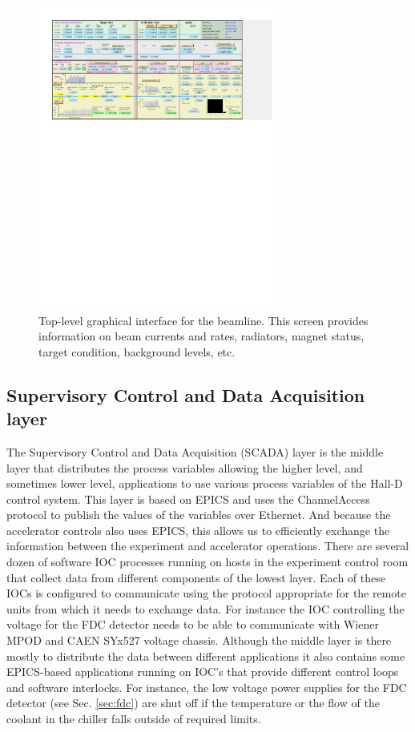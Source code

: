 \begin{landscape}
 \begin{figure}[tbp]
\begin{center}
\includegraphics[height=10cm,bb=35 480 535 760,clip=true]{figures/GlueX_CSS_overview.pdf}
\caption{Top-level graphical interface for the beamline. This screen provides information on beam currents and rates, radiators, magnet status, target condition, background levels, etc.
\label{fig:GlueX_CSS_overview}
}
\end{center}
\end{figure}
\end{landscape}

\subsection{Supervisory Control and Data Acquisition layer \label{sec:archiver}}
The Supervisory Control and Data Acquisition (SCADA) layer is the middle layer that distributes the process variables allowing the higher level, and sometimes lower level, applications to use various process variables of the Hall-D control system. This layer is based on EPICS and uses the ChannelAccess protocol to publish the values of the variables over Ethernet. And because the accelerator controls also uses EPICS, this allows us to efficiently exchange the information between the experiment and accelerator operations. There are several dozen of software IOC processes running on hosts in the experiment control room that collect data from different components of the lowest layer. Each of these IOCs is configured to communicate using the protocol appropriate for the remote units from which it needs to exchange data. For instance the IOC controlling the voltage for the FDC detector needs to be able to communicate with Wiener MPOD and CAEN SYx527 voltage chassis. Although the middle layer is there mostly to distribute the data between different applications it also contains some EPICS-based applications running on IOC's that provide different control loops and software interlocks.  For instance, the low voltage power supplies for the FDC detector (see Sec. \ref{sec:fdc}) are shut off if the temperature or the flow of the coolant in the chiller falls outside of required limits. 
